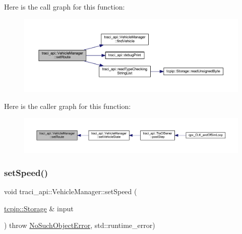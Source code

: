 Here is the call graph for this function\+:\nopagebreak
\begin{figure}[H]
\begin{center}
\leavevmode
\includegraphics[width=350pt]{classtraci__api_1_1_vehicle_manager_a30063f71f02a6272244d7d1e1e9ec99d_cgraph}
\end{center}
\end{figure}
Here is the caller graph for this function\+:\nopagebreak
\begin{figure}[H]
\begin{center}
\leavevmode
\includegraphics[width=350pt]{classtraci__api_1_1_vehicle_manager_a30063f71f02a6272244d7d1e1e9ec99d_icgraph}
\end{center}
\end{figure}
\mbox{\label{classtraci__api_1_1_vehicle_manager_a40adaaa7aaaae5708855c6c4715204fe}} 
\subsubsection{\texorpdfstring{set\+Speed()}{setSpeed()}}
{\footnotesize\ttfamily void traci\+\_\+api\+::\+Vehicle\+Manager\+::set\+Speed (\begin{DoxyParamCaption}\item[{\hyperlink{classtcpip_1_1_storage}{tcpip\+::\+Storage} \&}]{input }\end{DoxyParamCaption}) throw  \hyperlink{classtraci__api_1_1_no_such_object_error}{No\+Such\+Object\+Error}, std\+::runtime\+\_\+error) }

